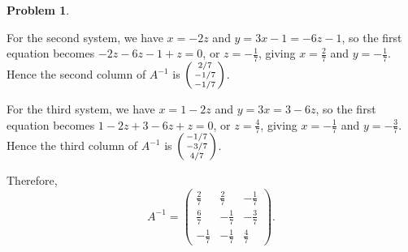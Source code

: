 \documentclass[11pt,oneside]{amsart}
\theoremstyle{definition}
\newtheorem{problem}{Problem}
\newcommand*\colvec[1]{\begin{psmallmatrix}#1\end{psmallmatrix}}
\begin{document}
\begin{problem}
\begin{enumerate}[(a)]
\begin{solution}
                For the second system, we have $x=-2z$ and $y=3x-1=-6z-1$, so the first equation becomes $-2z-6z-1+z=0$, or $z=-\frac 17$, giving $x=\frac 27$ and $y=-\frac17$. Hence the second column of $A^{-1}$ is $\colvec{2/7\\-1/7\\-1/7}$.

                For the third system, we have $x=1-2z$ and $y=3x=3-6z$, so the first equation becomes $1-2z+3-6z+z=0$, or $z=\frac 47$, giving $x=-\frac17$ and $y=-\frac37$. Hence the third column of $A^{-1}$ is $\colvec{-1/7\\-3/7\\4/7}$.

                Therefore,
                \[A^{-1}=\begin{pmatrix}
                    \frac27 & \frac27 & -\frac17\\
                    \frac67 & -\frac17 & -\frac37\\
                    -\frac17 & -\frac17 & \frac47
                \end{pmatrix}.\]
            \end{solution}
        \end{enumerate}
    \end{problem}
\end{document}
